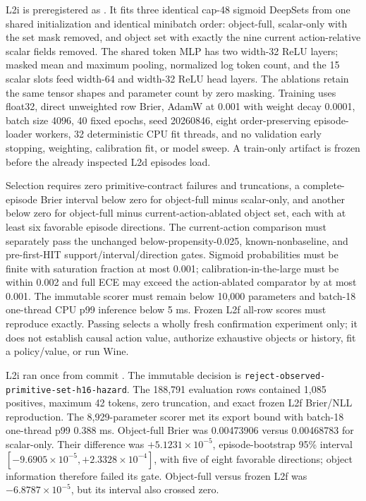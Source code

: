 \documentclass[11pt]{article}
\begin{document}
L2i is preregistered as
.  It fits three
identical cap-48 sigmoid DeepSets from one shared initialization and identical
minibatch order: object-full, scalar-only with the set mask removed, and object
set with exactly the nine current action-relative scalar fields removed.  The
shared token MLP has two width-32 ReLU layers; masked mean and maximum pooling,
normalized log token count, and the 15 scalar slots feed width-64 and width-32
ReLU head layers.  The ablations retain the same tensor shapes and parameter
count by zero masking.  Training uses float32, direct unweighted row Brier,
AdamW at 0.001 with weight decay 0.0001, batch size 4096, 40 fixed epochs, seed
20260846, eight order-preserving episode-loader workers, 32 deterministic CPU
fit threads, and no validation early stopping,
weighting, calibration fit, or model sweep.  A train-only artifact is frozen
before the already inspected L2d episodes load.

Selection requires zero primitive-contract failures and truncations, a
complete-episode Brier interval below zero for object-full minus scalar-only,
and another below zero for object-full minus current-action-ablated object set,
each with at least six favorable episode directions.  The current-action
comparison must separately pass the unchanged below-propensity-0.025,
known-nonbaseline, and pre-first-HIT support/interval/direction gates.  Sigmoid
probabilities must be finite with saturation fraction at most 0.001;
calibration-in-the-large must be within 0.002 and full ECE may exceed the
action-ablated comparator by at most 0.001.  The immutable scorer must remain
below 10,000 parameters and batch-18 one-thread CPU p99 inference below 5 ms.
Frozen L2f all-row scores must reproduce exactly.  Passing selects a wholly
fresh confirmation experiment only; it does not establish causal action value,
authorize exhaustive objects or history, fit a policy/value, or run Wine.

L2i ran once from commit
.  The immutable decision is
\texttt{reject-observed-primitive-set-h16-hazard}.  The 188,791 evaluation rows
contained 1,085 positives, maximum 42 tokens, zero truncation, and exact frozen
L2f Brier/NLL reproduction.  The 8,929-parameter scorer met its export bound
with batch-18 one-thread p99 0.388 ms.  Object-full Brier was 0.00473906 versus
0.00468783 for scalar-only.  Their difference was $+5.1231\times10^{-5}$,
episode-bootstrap 95\% interval
$[-9.6905\times10^{-5},+2.3328\times10^{-4}]$, with five of eight favorable
directions; object information therefore failed its gate.  Object-full versus
frozen L2f was $-6.8787\times10^{-5}$, but its interval also crossed zero.
\end{document}
